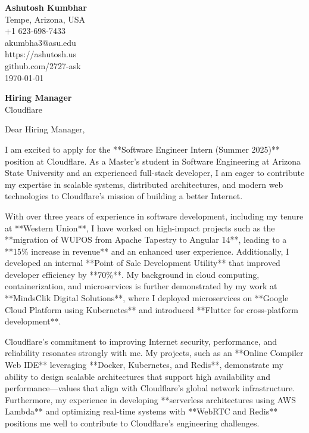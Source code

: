 \documentclass[11pt]{article}
\begin{document}
\begin{flushleft}
\textbf{Ashutosh Kumbhar} \\
Tempe, Arizona, USA \\
+1 623-698-7433 \\
akumbha3@asu.edu \\
https://ashutosh.us \\
github.com/2727-ask \\
\today
\end{flushleft}

\vspace{0.5em}

\textbf{Hiring Manager} \\
Cloudflare \\

\vspace{1em}

Dear Hiring Manager,

I am excited to apply for the **Software Engineer Intern (Summer 2025)** position at Cloudflare. As a Master's student in Software Engineering at Arizona State University and an experienced full-stack developer, I am eager to contribute my expertise in scalable systems, distributed architectures, and modern web technologies to Cloudflare’s mission of building a better Internet.

With over three years of experience in software development, including my tenure at **Western Union**, I have worked on high-impact projects such as the **migration of WUPOS from Apache Tapestry to Angular 14**, leading to a **15\% increase in revenue** and an enhanced user experience. Additionally, I developed an internal **Point of Sale Development Utility** that improved developer efficiency by **70\%**. My background in cloud computing, containerization, and microservices is further demonstrated by my work at **MindsClik Digital Solutions**, where I deployed microservices on **Google Cloud Platform using Kubernetes** and introduced **Flutter for cross-platform development**.

Cloudflare's commitment to improving Internet security, performance, and reliability resonates strongly with me. My projects, such as an **Online Compiler Web IDE** leveraging **Docker, Kubernetes, and Redis**, demonstrate my ability to design scalable architectures that support high availability and performance—values that align with Cloudflare’s global network infrastructure. Furthermore, my experience in developing **serverless architectures using AWS Lambda** and optimizing real-time systems with **WebRTC and Redis** positions me well to contribute to Cloudflare’s engineering challenges.
\end{document}
